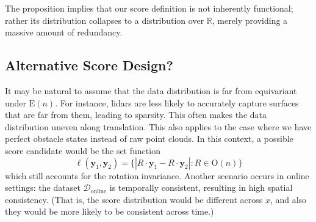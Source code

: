 \documentclass{article}
\begin{document}
{The proposition implies that our score definition is not inherently functional; rather its distribution collapses to a distribution over $\mathbb{R}$, merely providing a massive amount of redundancy.

\subsection{Alternative Score Design?}
It may be natural to assume that the data distribution is far from equivariant under $\mathrm{E}(n)$. For instance, lidars are less likely to accurately capture surfaces that are far from them, leading to sparsity. This often makes the data distribution uneven along translation. This also applies to the case where we have perfect obstacle states instead of raw point clouds.
In this context, a possible score candidate would be the set function
\begin{equation*}
\ell(\mathbf{y}_1, \mathbf{y}_2) = \{ \left| R\cdot \mathbf{y}_1 - R\cdot \mathbf{y}_2 \right|: R\in \mathrm{O}(n) \} 
\end{equation*}
which still accounts for the rotation invariance.
Another scenario occurs in online settings: the dataset $\mathcal{D}_{\text{online}}$ is temporally consistent, resulting in high spatial consistency. (That is, the score distribution would be different across $x$, and also they would be more likely to be consistent across time.)
}
\end{document}
